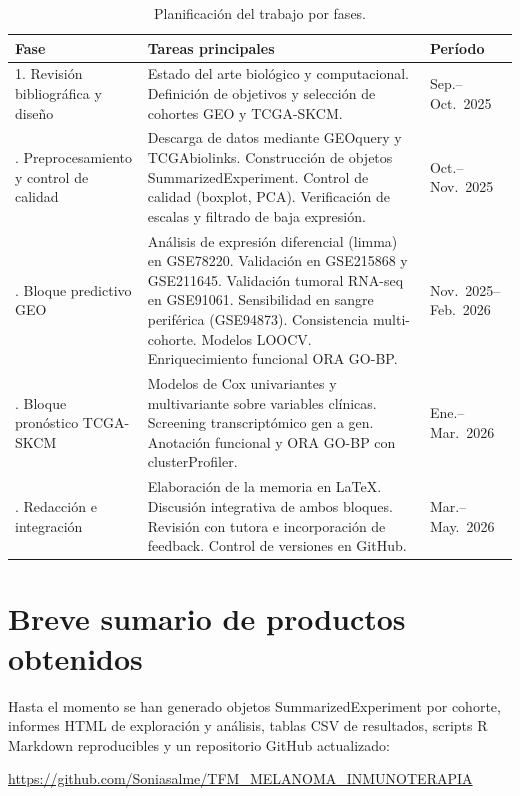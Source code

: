 \begin{table}[H]
\centering
\caption{Planificación del trabajo por fases.}
\label{tab:planificacion}
\begin{tabularx}{\textwidth}{l X l}
\toprule
\textbf{Fase} & \textbf{Tareas principales} & \textbf{Período} \\
\midrule
1. Revisión bibliográfica y diseño
  & Estado del arte biológico y computacional. Definición de objetivos y selección de cohortes GEO y TCGA-SKCM.
  & Sep.--Oct.\ 2025 \\
\addlinespace
2. Preprocesamiento y control de calidad
  & Descarga de datos mediante GEOquery y TCGAbiolinks. Construcción de objetos SummarizedExperiment. Control de calidad (boxplot, PCA). Verificación de escalas y filtrado de baja expresión.
  & Oct.--Nov.\ 2025 \\
\addlinespace
3. Bloque predictivo GEO
  & Análisis de expresión diferencial (limma) en GSE78220. Validación en GSE215868 y GSE211645. Validación tumoral RNA-seq en GSE91061. Sensibilidad en sangre periférica (GSE94873). Consistencia multi-cohorte. Modelos LOOCV. Enriquecimiento funcional ORA GO-BP.
  & Nov.\ 2025--Feb.\ 2026 \\
\addlinespace
4. Bloque pronóstico TCGA-SKCM
  & Modelos de Cox univariantes y multivariante sobre variables clínicas. Screening transcriptómico gen a gen. Anotación funcional y ORA GO-BP con clusterProfiler.
  & Ene.--Mar.\ 2026 \\
\addlinespace
5. Redacción e integración
  & Elaboración de la memoria en \LaTeX. Discusión integrativa de ambos bloques. Revisión con tutora e incorporación de feedback. Control de versiones en GitHub.
  & Mar.--May.\ 2026 \\
\bottomrule
\end{tabularx}
\end{table}

\section{Breve sumario de productos obtenidos}

Hasta el momento se han generado objetos SummarizedExperiment por cohorte, informes HTML de exploración y análisis, tablas CSV de resultados, scripts R Markdown reproducibles y un repositorio GitHub actualizado:

\begin{center}
\url{https://github.com/Soniasalme/TFM_MELANOMA_INMUNOTERAPIA}
\end{center}

